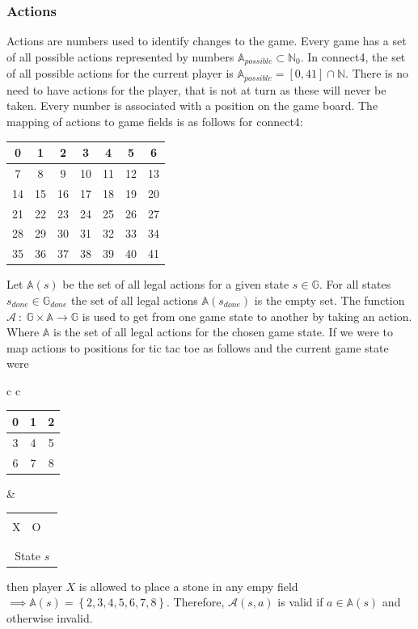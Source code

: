 \documentclass[12pt]{article}
\newcommand{\tickTackToe}[9]{
\begin{tabular}{p{7px}|p{7px}|p{7px}}
\multicolumn{3}{c}{}\\
  #1 & #2 & #3 \\      \hline
  #4 & #5 & #6 \\      \hline
   & #7 & #8\\
\multicolumn{3}{c}{#9}
\end{tabular}
}
\begin{document}
\subsubsection{Actions}
Actions are numbers used to identify changes to the game. Every game has a set of all possible actions represented by numbers \(\mathbb{A}_{possible} \subset \mathbb{N}_0\). In connect4, the set of all possible actions for the current player is \(\mathbb{A}_{possible} = [0, 41]\cap\mathbb N\). There is no need to have actions for the player, that is not at turn as these will never be taken. Every number is associated with a position on the game board. The mapping of actions to game fields is as follows for connect4:
\begin{center}
\begin{tabular}{| c | c | c | c | c | c | c |}
 \hline
0 & 1 & 2 & 3 & 4 & 5 & 6  \\\hline
7 & 8 & 9 & 10 & 11 & 12 & 13\\\hline
14 & 15 & 16 & 17 & 18 & 19 & 20 \\\hline
21 & 22 & 23& 24 & 25 & 26 & 27 \\\hline
28 & 29 & 30 & 31 & 32 & 33 & 34 \\\hline
35 & 36 & 37 & 38 & 39 & 40 & 41 \\\hline
\end{tabular}
\end{center}
Let \(\mathbb{A}(s)\) be the set of all legal actions for a given state  \(s \in \mathbb{G}\). For all states \(s_{done} \in \mathbb{G}_{done}\) the set of all legal actions \(\mathbb{A}(s_{done})\) is the empty set. The function \(\mathcal{A}~:~\mathbb{G}\times\mathbb{A}\to\mathbb{G}\) is used to get from one game state to another by taking an action. Where \(\mathbb A\) is the set of all legal actions for the chosen game state. If we were to map actions to positions for tic tac toe as follows and the current game state were
\begin{center}\begin{tabular} { c c }
\begin{tabular}{| c | c | c |}
 \hline
 0 & 1 & 2 \\\hline
 3 & 4 & 5 \\\hline
 6 & 7 & 8 \\\hline
\end{tabular} & \tickTackToe{X}{O}{}{}{}{}{}{}{State \(s\)}
\end{tabular}\end{center}
then player \(X\) is allowed to place a stone in any empy field \(\implies\mathbb A(s) = \left\{ 2, 3, 4, 5, 6, 7, 8 \right\}\). Therefore, \(\mathcal A(s, a)\) is valid if \(a \in \mathbb A(s)\) and otherwise invalid.
\end{document}
